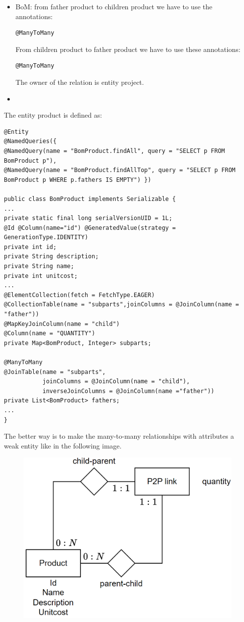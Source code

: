 \begin{itemize}
    \item BoM: from father product to children product we have to use the annotations: 
        \begin{lstlisting}[style=Java]
@ManyToMany
        \end{lstlisting}
        From children product to father product we have to use these annotations: 
        \begin{lstlisting}[style=Java]
@ManyToMany
        \end{lstlisting}
        The owner of the relation is entity project. 
    \item 
\end{itemize}
The entity product is defined as:  
    \begin{lstlisting}[style=Java]
@Entity
@NamedQueries({
@NamedQuery(name = "BomProduct.findAll", query = "SELECT p FROM BomProduct p"),
@NamedQuery(name = "BomProduct.findAllTop", query = "SELECT p FROM BomProduct p WHERE p.fathers IS EMPTY") })

public class BomProduct implements Serializable {
...
private static final long serialVersionUID = 1L;
@Id @Column(name="id") @GeneratedValue(strategy = GenerationType.IDENTITY)
private int id;
private String description;
private String name;
private int unitcost;
...
@ElementCollection(fetch = FetchType.EAGER)
@CollectionTable(name = "subparts",joinColumns = @JoinColumn(name = "father"))
@MapKeyJoinColumn(name = "child")
@Column(name = "QUANTITY")
private Map<BomProduct, Integer> subparts;

@ManyToMany
@JoinTable(name = "subparts",
           joinColumns = @JoinColumn(name = "child"),
           inverseJoinColumns = @JoinColumn(name ="father"))
private List<BomProduct> fathers;
...            
}
    \end{lstlisting}
The better way is to make the many-to-many relationships with attributes a weak entity like in the following image. 
\begin{figure}[H]
    \centering
    \includegraphics[width=0.6\linewidth]{images/BoMweak.png}
\end{figure}
